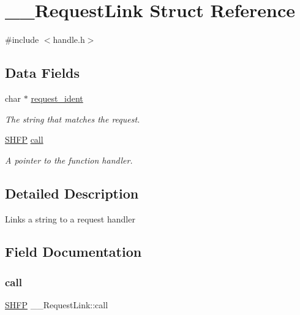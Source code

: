 \hypertarget{struct_____request_link}{}\section{\+\_\+\+\_\+\+Request\+Link Struct Reference}
\label{struct_____request_link}


{\ttfamily \#include $<$handle.\+h$>$}

\subsection*{Data Fields}
\begin{DoxyCompactItemize}
\item 
char $\ast$ \mbox{\hyperlink{struct_____request_link_ac6729255e75aaf3ad7a9f6f94d0e36e8}{request\+\_\+ident}}
\begin{DoxyCompactList}\small\item\em The string that matches the request. \end{DoxyCompactList}\item 
\mbox{\hyperlink{handle_8h_a21ced4481879f31088fa333eedee03e1}{S\+H\+FP}} \mbox{\hyperlink{struct_____request_link_ae6808c43ccb87f560298a584449b7346}{call}}
\begin{DoxyCompactList}\small\item\em A pointer to the function handler. \end{DoxyCompactList}\end{DoxyCompactItemize}


\subsection{Detailed Description}
Links a string to a request handler 

\subsection{Field Documentation}
\mbox{\label{struct_____request_link_ae6808c43ccb87f560298a584449b7346}} 
\subsubsection{\texorpdfstring{call}{call}}
{\footnotesize\ttfamily \mbox{\hyperlink{handle_8h_a21ced4481879f31088fa333eedee03e1}{S\+H\+FP}} \+\_\+\+\_\+\+Request\+Link\+::call}



